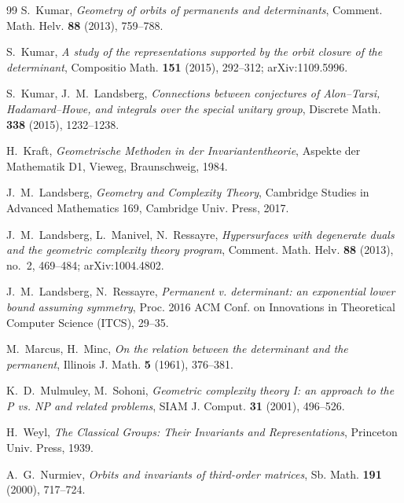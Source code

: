 \documentclass[11pt,reqno]{amsart}
\theoremstyle{plain}
\theoremstyle{definition}
\begin{document}
\begin{thebibliography}{99}
S.~Kumar,
\emph{Geometry of orbits of permanents and determinants},
Comment. Math. Helv. \textbf{88} (2013), 759--788.

S.~Kumar,
\emph{A study of the representations supported by the orbit closure of the
determinant},
Compositio Math. \textbf{151} (2015), 292--312; arXiv:1109.5996.

S.~Kumar, J.~M.~Landsberg,
\emph{Connections between conjectures of Alon--Tarsi, Hadamard--Howe, and
integrals over the special unitary group},
Discrete Math. \textbf{338} (2015), 1232--1238.

H.~Kraft,
\emph{Geometrische Methoden in der Invariantentheorie},
Aspekte der Mathematik D1, Vieweg, Braunschweig, 1984.

J.~M.~Landsberg,
\emph{Geometry and Complexity Theory},
Cambridge Studies in Advanced Mathematics 169, Cambridge Univ. Press, 2017.

J.~M.~Landsberg, L.~Manivel, N.~Ressayre,
\emph{Hypersurfaces with degenerate duals and the geometric complexity theory
program},
Comment. Math. Helv. \textbf{88} (2013), no.~2, 469--484; arXiv:1004.4802.

J.~M.~Landsberg, N.~Ressayre,
\emph{Permanent v. determinant: an exponential lower bound assuming symmetry},
Proc. 2016 ACM Conf. on Innovations in Theoretical Computer Science (ITCS),
29--35.

M.~Marcus, H.~Minc,
\emph{On the relation between the determinant and the permanent},
Illinois J. Math. \textbf{5} (1961), 376--381.

K.~D.~Mulmuley, M.~Sohoni,
\emph{Geometric complexity theory I: an approach to the P vs. NP and related
problems},
SIAM J. Comput. \textbf{31} (2001), 496--526.

H.~Weyl,
\emph{The Classical Groups: Their Invariants and Representations},
Princeton Univ. Press, 1939.

A.~G.~Nurmiev,
\emph{Orbits and invariants of third-order matrices},
Sb. Math. \textbf{191} (2000), 717--724.

\end{thebibliography}
\end{document}
